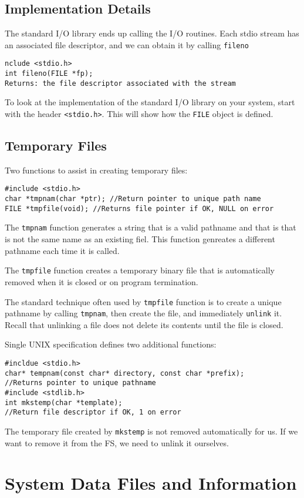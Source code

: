 \documentclass[a4paper,10pt]{book}
\begin{document}
\section{Implementation Details}
The standard I/O library ends up calling the I/O routines. Each stdio stream has
an associated file descriptor, and we can obtain it by calling \verb|fileno|
\begin{verbatim}
nclude <stdio.h>
int fileno(FILE *fp);
Returns: the file descriptor associated with the stream
\end{verbatim}

To look at the implementation of the standard I/O library on your system, start
with the header \verb|<stdio.h>|. This will show how the \verb|FILE| object is
defined.

\section{Temporary Files}
Two functions to assist in creating temporary files:
\begin{verbatim}
#include <stdio.h>
char *tmpnam(char *ptr); //Return pointer to unique path name
FILE *tmpfile(void); //Returns file pointer if OK, NULL on error
\end{verbatim}
The \verb|tmpnam| function generates a string that is a valid pathname and that is that
is not the same name as an existing fiel. This function genreates a different
pathname each time it is called. 

The \verb|tmpfile| function creates a temporary binary file that is
automatically removed when it is closed or on program termination.

The standard technique often used by \verb|tmpfile| function is to create a
unique pathname by calling \verb|tmpnam|, then create the file, and immediately
\verb|unlink| it. Recall that unlinking a file does not delete its contents
until the file is closed.

Single UNIX specification defines two additional functions:
\begin{verbatim}
#incldue <stdio.h>
char* tempnam(const char* directory, const char *prefix);
//Returns pointer to unique pathname
#include <stdlib.h>
int mkstemp(char *template);
//Return file descriptor if OK, 1 on error
\end{verbatim}

The temporary file created by \verb|mkstemp| is not removed automatically for
us. If we want to remove it from the FS, we need to unlink it ourselves.
\chapter{System Data Files and Information}
\end{document}
